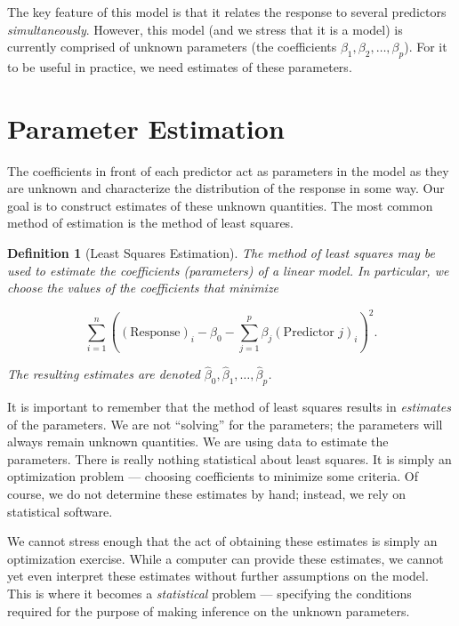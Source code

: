 \documentclass[
]{book}
\theoremstyle{plain}
\theoremstyle{mydefn}
\newtheorem{definition}{Definition}[chapter]
\theoremstyle{myexmpl}
\theoremstyle{remark}
\begin{document}
The key feature of this model is that it relates the response to several predictors \emph{simultaneously}. However, this model (and we stress that it is a model) is currently comprised of unknown parameters (the coefficients \(\beta_1, \beta_2, \dotsc, \beta_p\)). For it to be useful in practice, we need estimates of these parameters.

\hypertarget{parameter-estimation}{%
\section{Parameter Estimation}\label{parameter-estimation}}

The coefficients in front of each predictor act as parameters in the model as they are unknown and characterize the distribution of the response in some way. Our goal is to construct estimates of these unknown quantities. The most common method of estimation is the method of least squares.

\begin{definition}[Least Squares Estimation]
The method of least squares may be used to estimate the coefficients (parameters) of a linear model. In particular, we choose the values of the coefficients that minimize

\[\sum\limits_{i=1}^{n} \left((\text{Response})_i - \beta_0 - \sum\limits_{j=1}^{p} \beta_j (\text{Predictor } j)_{i}\right)^2.\]

The resulting estimates are denoted \(\widehat{\beta}_0, \widehat{\beta}_1, \dotsc, \widehat{\beta}_p\).
\end{definition}

It is important to remember that the method of least squares results in \emph{estimates} of the parameters. We are not ``solving'' for the parameters; the parameters will always remain unknown quantities. We are using data to estimate the parameters. There is really nothing statistical about least squares. It is simply an optimization problem --- choosing coefficients to minimize some criteria. Of course, we do not determine these estimates by hand; instead, we rely on statistical software.

We cannot stress enough that the act of obtaining these estimates is simply an optimization exercise. While a computer can provide these estimates, we cannot yet even interpret these estimates without further assumptions on the model. This is where it becomes a \emph{statistical} problem --- specifying the conditions required for the purpose of making inference on the unknown parameters.
\end{document}
